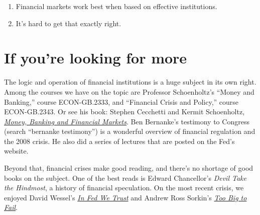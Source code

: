 \setlength{\leftmargini}{.5\oldleftmargini}
\begin{enumerate}
\item Financial markets work best when based on effective institutions.
\item It's hard to get that exactly right.
\end{enumerate}
\setlength{\leftmargini}{\oldleftmargini}


\begin{comment}
\section*{Review questions}

\begin{enumerate}

\item ...
\end{enumerate}
\end{comment}

\section*{If you're looking for more}

The logic and operation of financial institutions is a huge subject
in its own right.
Among the courses we have on the topic are Professor Schoenholtz's
``Money and Banking,'' course ECON-GB.2333,
and ``Financial Crisis and Policy,'' course ECON-GB.2343. 
Or see his book:
Stephen Cecchetti and Kermit Schoenholtz,
\href{http://www.amazon.com/Banking-Financial-Markets-Stephen-Cecchetti/dp/007337590X/}
{\it Money, Banking and Financial Markets\/}.
Ben Bernanke's testimony to Congress (search ``bernanke testimony'')
is a wonderful overview of financial regulation and the 2008 crisis.
He also did a series of lectures that are posted on the Fed's website.

Beyond that, financial crises make good reading, and there's no shortage
of good books on the subject.
One of the best reads is Edward Chancellor's {\it Devil Take the Hindmost\/},
a history of financial speculation.
On the most recent crisis,
we enjoyed David Wessel's
\href{http://www.amazon.com/FED-We-Trust-Bernankes-Great/dp/0307459691/}
{\it In Fed We Trust\/}
and Andrew Ross Sorkin's
\href{http://www.amazon.com/Too-Big-Fail-Washington-FinancialSystem/dp/0143120271/}
{\it Too Big to Fail\/}.
